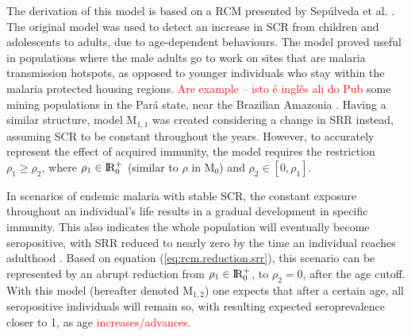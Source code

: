 The derivation of this model is based on a RCM presented by Sepúlveda et al. \cite{sepulveda2015current}.
The original model was used to detect an increase in SCR from children and adolescents to adults, due to age-dependent behaviours.
The model proved useful in populations where the male adults go to work on sites that are malaria transmission hotspots, as opposed to younger individuals who stay within the malaria protected housing regions.
\textcolor{red}{Are example -- isto é inglês ali do Pub} some mining populations in the Pará state, near the Brazilian Amazonia \cite{cunha2014serologically}.
Having a similar structure, model M$_{1,1}$ was created considering a change in SRR instead, assuming SCR to be constant throughout the years.
However, to accurately represent the effect of acquired immunity, the model requires the restriction $\rho_1\geq\rho_2$, where $\rho_1 \in  \rm I\!R_{0}^{+}$ (similar to $\rho$ in M$_0$) and $\rho_2 \in [0,\rho_1]$.

In scenarios of endemic malaria with stable SCR, the constant exposure throughout an individual's life results in a gradual development in specific immunity.
This also indicates the whole population will eventually become seropositive, with SRR reduced to nearly zero by the time an individual reaches adulthood \cite{ondigo2014estimation}.
Based on equation (\ref{eq:rcm.reduction.srr}), this scenario can be represented by an abrupt reduction from $\rho_1 \in \rm I\!R_{0}^{+}$, to $\rho_2=0$, after the age cutoff.
With this model (hereafter denoted M$_{1,2}$) one expects that after a certain age, all seropositive individuals will remain so, with resulting expected seroprevalence closer to 1, as age \textcolor{red}{increases/advances}.
\\
\\

